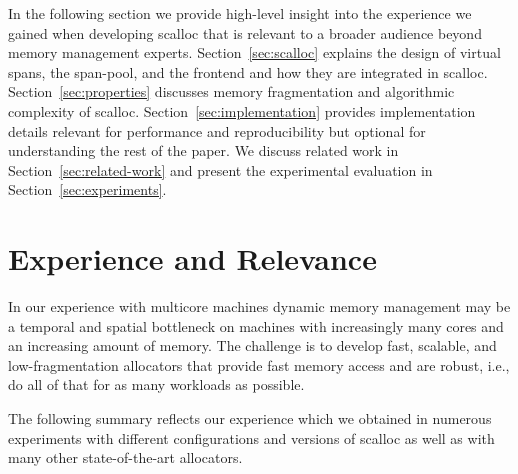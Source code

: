 \documentclass[10pt]{sigplanconf}
\begin{document}
In the following section we provide high-level insight into the experience we gained when developing scalloc that is relevant to a broader audience beyond memory management experts. Section~\ref{sec:scalloc} explains the design of virtual spans, the span-pool, and the frontend and how they are integrated in scalloc. Section~\ref{sec:properties} discusses memory fragmentation and algorithmic complexity of scalloc. Section~\ref{sec:implementation} provides implementation details relevant for performance and reproducibility but optional for understanding the rest of the paper. We discuss related work in Section~\ref{sec:related-work} and present the experimental evaluation in Section~\ref{sec:experiments}.

\section{Experience and Relevance}

In our experience with multicore machines dynamic memory management may be a temporal and spatial bottleneck on machines with increasingly many cores and an increasing amount of memory. The challenge is to develop fast, scalable, and low-fragmentation allocators that provide fast memory access and are robust, i.e., do all of that for as many workloads as possible.

The following summary reflects our experience which we obtained in numerous experiments with different configurations and versions of scalloc as well as with many other state-of-the-art allocators.
\end{document}
